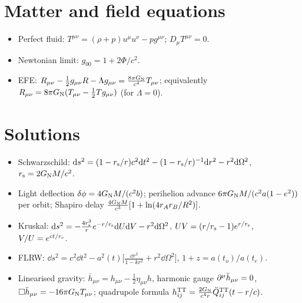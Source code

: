 \section*{Matter and field equations}
\begin{itemize}[nosep]
\item Perfect fluid: $T^{\mu\nu}=(\rho+p)u^\mu u^\nu-pg^{\mu\nu}$; $D_\mu T^{\mu\nu}=0$.
\item Newtonian limit: $g_{00}=1+2\Phi/c^2$.
\item EFE: $R_{\mu\nu}-\frac12g_{\mu\nu}R-\Lambda g_{\mu\nu}=\frac{8\pi G_{\mathrm N}}{c^4}T_{\mu\nu}$; equivalently $R_{\mu\nu}=8\pi G_{\mathrm N}(T_{\mu\nu}-\frac12Tg_{\mu\nu})$ (for $\Lambda=0$).
\end{itemize}
\section*{Solutions}
\begin{itemize}[nosep]
\item Schwarzschild: $\mathrm{d} s^2=(1-r_{\mathrm s}/r)c^2\mathrm{d} t^2-(1-r_{\mathrm s}/r)^{-1}\mathrm{d} r^2-r^2\mathrm{d}\Omega^2$, $r_{\mathrm s}=2G_{\mathrm N} M/c^2$.
\item Light deflection $\delta\phi=4G_{\mathrm N} M/(c^2b)$; perihelion advance $6\pi G_{\mathrm N} M/(c^2a(1-e^2))$ per orbit; Shapiro delay $\frac{4G_{\mathrm N} M}{c^3}[1+\ln(4r_Ar_B/R^2)]$.
\item Kruskal: $\mathrm{d} s^2=-\frac{4r_{\mathrm s}^3}{r}e^{-r/r_{\mathrm s}}\mathrm{d} U\mathrm{d} V-r^2\mathrm{d}\Omega^2$, $UV=(r/r_{\mathrm s}-1)e^{r/r_{\mathrm s}}$, $V/U=e^{ct/r_{\mathrm s}}$.
\item FLRW: $\dd s^2=c^2\dd t^2-a^2(t)\big[\frac{\dd r^2}{1-kr^2}+r^2\dd\Omega^2\big]$, $1+z=a(t_o)/a(t_e)$.
\item Linearised gravity: $\bar h_{\mu\nu}=h_{\mu\nu}-\frac12\eta_{\mu\nu}h$, harmonic gauge $\partial^\mu\bar h_{\mu\nu}=0$, $\square\bar h_{\mu\nu}=-16\pi G_{\mathrm N} T_{\mu\nu}$; quadrupole formula $h^{\rm TT}_{ij}=\frac{2G_{\mathrm N}}{c^4r}\ddot Q^{\rm TT}_{ij}(t-r/c)$.
\end{itemize}

